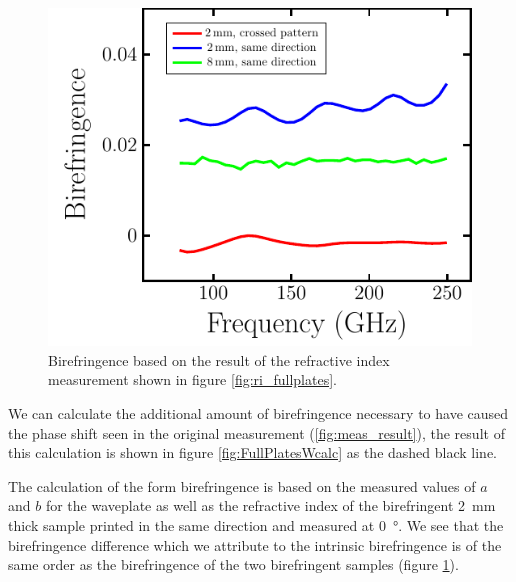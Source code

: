 \begin{figure}[H]
    \centering
    \includegraphics[scale=.56]{images/results/plots/polymer/IntrinsicBF/FullPlates.pdf}
    \caption{Birefringence based on the result of the refractive index measurement shown in figure \ref{fig:ri_fullplates}.}
    \label{fig:FullPlates_bf}
\end{figure}

We can calculate the additional amount of birefringence necessary to have caused the phase shift seen in the original measurement (\ref{fig:meas_result}), the result of this calculation is shown in figure \ref{fig:FullPlatesWcalc} as the dashed black line. 

The calculation of the form birefringence is based on the measured values of $a$ and $b$ for the waveplate as well as the refractive index of the birefringent \SI{2}{\milli \meter} thick sample printed in the same direction and measured at \SI{0}{\degree}. We see that the birefringence difference which we attribute to the intrinsic birefringence is of the same order as the birefringence of the two birefringent samples (figure \ref{fig:FullPlates_bf}). 


